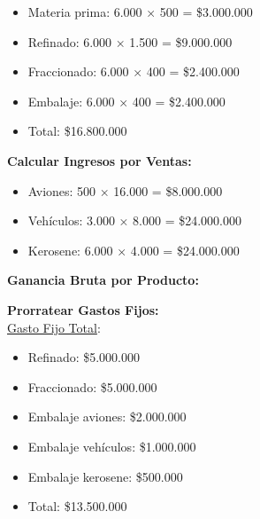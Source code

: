 \documentclass[10pt,a4paper]{article}
\begin{document}
\begin{enumerate}[label=\textbf{\sffamily\large\arabic*.}]
\begin{itemize}
        \item Materia prima: 6.000 × 500 = \$3.000.000
        \item Refinado: 6.000 × 1.500 = \$9.000.000
        \item Fraccionado: 6.000 × 400 = \$2.400.000
        \item Embalaje: 6.000 × 400 = \$2.400.000 \\
        \item Total: \$16.800.000\\

    \end{itemize}

    \textbf{Calcular Ingresos por Ventas:}

    \begin{itemize}

        \item Aviones: 500 × 16.000 = \$8.000.000
        \item Vehículos: 3.000 × 8.000 = \$24.000.000
        \item Kerosene: 6.000 × 4.000 = \$24.000.000 \\

    \end{itemize}

    \textbf{Ganancia Bruta por Producto:}

    \begin{center}
    \end{center}
    
    \clearpage

    \textbf{Prorratear Gastos Fijos:} \\

    \underline{Gasto Fijo Total}:

    \begin{itemize}

        \item Refinado: \$5.000.000
        \item Fraccionado: \$5.000.000
        \item Embalaje aviones: \$2.000.000
        \item Embalaje vehículos: \$1.000.000
        \item Embalaje kerosene: \$500.000 \\
        \item Total: \$13.500.000 \\


\end{itemize}
\end{enumerate}
\end{document}
